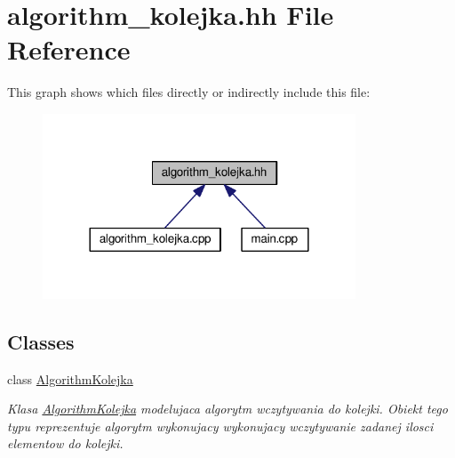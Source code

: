\hypertarget{algorithm__kolejka_8hh}{}\section{algorithm\+\_\+kolejka.\+hh File Reference}
\label{algorithm__kolejka_8hh}
This graph shows which files directly or indirectly include this file\+:\nopagebreak
\begin{figure}[H]
\begin{center}
\leavevmode
\includegraphics[width=264pt]{algorithm__kolejka_8hh__dep__incl}
\end{center}
\end{figure}
\subsection*{Classes}
\begin{DoxyCompactItemize}
\item 
class \hyperlink{class_algorithm_kolejka}{Algorithm\+Kolejka}
\begin{DoxyCompactList}\small\item\em Klasa \hyperlink{class_algorithm_kolejka}{Algorithm\+Kolejka} modelujaca algorytm wczytywania do kolejki. Obiekt tego typu reprezentuje algorytm wykonujacy wykonujacy wczytywanie zadanej ilosci elementow do kolejki. \end{DoxyCompactList}\end{DoxyCompactItemize}
